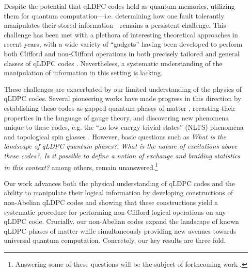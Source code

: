 \documentclass[aps,prx,reprint,superscriptaddress,nofootinbib]{revtex4-2}
\theoremstyle{definition}
\newcommand{\<}{\langle}
\renewcommand{\>}{\rangle}
\begin{document}
Despite the potential that qLDPC codes hold as quantum memories, utilizing them for quantum computation---i.e. determining how one fault tolerantly manipulates their stored information---remains a persistent challenge.
%
This challenge has been met with a plethora of interesting theoretical approaches in recent years, with a wide variety of ``gadgets'' having been developed to perform both Clifford and non-Clifford operations in both precisely tailored and general classes of qLDPC codes \cite{xu2023constantoverheadfaulttolerantquantumcomputation,xu2024fastparallelizablelogicalcomputation,xu2025batchedhighratelogicaloperations,zheng2025highratesurgeryconstantoverheadlogical,berthusen2025automorphismgadgetshomologicalproduct,cross2025improvedqldpcsurgerylogical,swaroop2025universaladaptersquantumldpc,he2025extractorsqldpcarchitecturesefficient}.
%
Nevertheless, a systematic understanding of the manipulation of information in this setting is lacking.

These challenges are exacerbated by our limited understanding of the physics of qLDPC codes.
%
Several pioneering works have made progress in this direction by establishing these codes as gapped quantum phases of matter \cite{rakovszky2023physicsgoodldpccodes,rakovszky2024physicsgoodldpccodes,GappedLDPC,yin_low-density_2025,Tan_2025}, recasting their properties in the language of gauge theory, and discovering new phenomena unique to these codes, e.g. the ``no low-energy trivial states'' (NLTS) phenomena \cite{Anshu_2023} and topological spin glasses \cite{placke_topological_2024}.
%
However, basic questions such as \textit{What is the landscape of qLDPC quantum phases?}, \textit{What is the nature of excitations above these codes?}, \textit{Is it possible to define a notion of exchange and braiding statistics in this context?} among others, remain unanswered.\footnote{Answering some of these questions will be the subject of forthcoming work \cite{homologicalorder}.}


Our work advances both the physical understanding of qLDPC codes and the ability to manipulate their logical information by developing constructions of non-Abelian qLDPC codes and showing that these constructions yield a systematic procedure for performing non-Clifford logical operations on any qLDPC code.
%
Crucially, our non-Abelian codes expand the landscape of known qLDPC phases of matter while simultaneously providing new avenues towards universal quantum computation.
%
Concretely, our key results are three fold.
\end{document}
